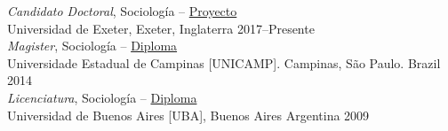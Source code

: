 {\sl Candidato Doctoral}, Sociología -- \href{http://ramoneando.com/docs/juarez-benjamin-2017-01-23-phd-project-exeter-7.pdf}{Proyecto} \\
Universidad de Exeter, Exeter, Inglaterra \hfill 2017--Presente  \\


{\sl Magister}, Sociología -- \href{http://ramoneando.com/docs/mestre-2014-red-tape.pdf}{Diploma} \\ 
Universidade Estadual de Campinas [UNICAMP]. Campinas, São Paulo. Brazil \hfill 2014\\


{\sl Licenciatura}, Sociología -- \href{https://bit.ly/2xrcYOo}{Diploma}\\ 
Universidad de Buenos Aires [UBA], Buenos Aires Argentina \hfill 2009 \\



% 

  

  
